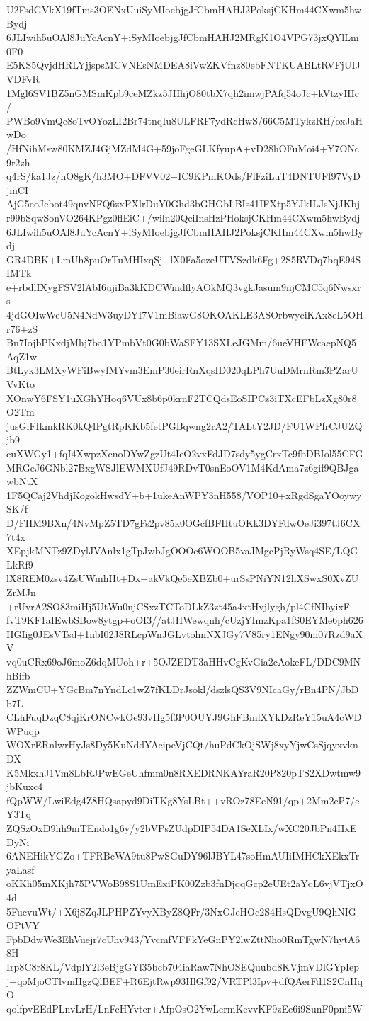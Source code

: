 U2FsdGVkX19fTms3OENxUuiSyMIoebjgJfCbmHAHJ2PoksjCKHm44CXwm5hwBydj
6JLIwih5uOAl8JuYcAcnY+iSyMIoebjgJfCbmHAHJ2MRgK1O4VPG73jxQYlLm0F0
E5KS5QvjdHRLYjjspsMCVNEsNMDEA8iVwZKVfnz80ebFNTKUABLtRVFjUIJVDFvR
1Mgl6SV1BZ5nGMSmKpb9ceMZkz5JHhjO80tbX7qh2imwjPAfq54oJc+kVtzyIHc/
PWBo9VmQc8oTvOYozLI2Br74tnqIu8ULFRF7ydRcHwS/66C5MTykzRH/oxJaHwDo
/HfNihMsw80KMZJ4GjMZdM4G+59joFgeGLKfyupA+vD28hOFuMoi4+Y7ONc9r2zh
q4rS/ka1Jz/hO8gK/h3MO+DFVV02+IC9KPmKOds/FlFziLuT4DNTUFf97VyDjmCI
AjG5eoJebot49qnvNFQ6zxPXlrDuY0Ghd3bGHGbLBIs41IFXtp5YJkILJsNjJKbj
r99bSqwSonVO264KPgz0flEiC+/wiln20QeiInsHzPHoksjCKHm44CXwm5hwBydj
6JLIwih5uOAl8JuYcAcnY+iSyMIoebjgJfCbmHAHJ2PoksjCKHm44CXwm5hwBydj
GR4DBK+LmUh8puOrTuMHIxqSj+lX0Fa5ozeUTVSzdk6Fg+2S5RVDq7bqE94SIMTk
e+rbdlIXygFSV2lAbI6ujiBa3kKDCWmdflyAOkMQ3vgkJasum9njCMC5q6Nwsxrs
4jdGOIwWeU5N4NdW3uyDYI7V1mBiawG8OKOAKLE3ASOrbwyciKAx8eL5OHr76+zS
Bn7IojbPKxdjMhj7ba1YPmbVt0G0bWaSFY13SXLeJGMm/6ueVHFWcaepNQ5AqZ1w
BtLyk3LMXyWFiBwyfMYvm3EmP30eirRnXqsID020qLPh7UuDMrnRm3PZarUVvKto
XOnwY6FSY1uXGhYHoq6VUx8b6p0krnF2TCQdsEoSIPCz3iTXcEFbLzXg80r8O2Tm
jusGlFIkmkRK0kQ4PgtRpKKb5fetPGBqwng2rA2/TALtY2JD/FU1WPfrCJUZQjb9
cuXWGy1+fqI4XwpzXcnoDYwZgzUt4IeO2vxFdJD7sdy5ygCrxTc9fbDBIol55CFG
MRGeJ6GNbl27BxgWSJlEWMXUfJ49RDvT0snEoOV1M4KdAma7z6gif9QBJgawbNtX
1F5QCaj2VhdjKogokHwsdY+b+1ukeAnWPY3nH558/VOP10+xRgdSgaYOoywySK/f
D/FHM9BXn/4NvMpZ5TD7gFs2pv85k0OGcfBFHtuOKk3DYFdwOeJi397tJ6CX7t4x
XEpjkMNTz9ZDylJVAnlx1gTpJwbJgOOOc6WOOB5vaJMgcPjRyWsq4SE/LQGLkRf9
lX8REM0zsv4ZsUWmhHt+Dx+akVkQe5eXBZb0+urSsPNiYN12hXSwxS0XvZUZrMJn
+rUvrA2SO83miHj5UtWu0njCSxzTCToDLkZ3zt45a4xtHvjlygh/pl4CfNIbyixF
fvT9KF1aIEwbSBow8ytgp+oOI3//atJHWewqnh/cUzjYImzKpa1fS0EYMe6ph626
HGIig0JEsVTsd+1nbI02J8RLcpWnJGLvtohnNXJGy7V85ry1ENgy90m07Rzd9aXV
vq0uCRx69oJ6moZ6dqMUoh+r+5OJZEDT3aHHvCgKvGia2cAokeFL/DDC9MNhBifb
ZZWmCU+YGcBm7nYndLc1wZ7fKLDrJsokl/dszlsQS3V9NIcaGy/rBn4PN/JbDb7L
CLhFuqDzqC8qjKrONCwkOe93vHg5f3P0OUYJ9GhFBmlXYkDzReY15uA4cWDWPuqp
WOXrERnlwrHyJs8Dy5KuNddYAeipeVjCQt/huPdCkOjSWj8xyYjwCsSjqyxvknDX
K5MkxhJ1Vm8LbRJPwEGeUhfmm0n8RXEDRNKAYraR20P820pTS2XDwtmw9jbKuxc4
fQpWW/LwiEdg4Z8HQsapyd9DiTKg8YsLBt++vROz78EeN91/qp+2Mm2eP7/eY3Tq
ZQSzOxD9hh9mTEndo1g6y/y2bVPsZUdpDIP54DA1SeXLIx/wXC20JbPn4HxEDyNi
6ANEHikYGZo+TFRBcWA9tu8PwSGuDY96lJBYL47soHmAUIiIMHCkXEkxTryaLasf
oKKh05mXKjh75PVWoB98S1UmExiPK00Zzb3fnDjqqGcp2eUEt2aYqL6vjVTjxO4d
5FucvuWt/+X6jSZqJLPHPZYvyXByZ8QFr/3NxGJeHOc2S4HsQDvgU9QhNIGOPtVY
FpbDdwWe3EhVuejr7cUhv943/YvcmfVFFkYeGnPY2lwZttNho0RmTgwN7hytA68H
Irp8C8r8KL/VdplY2l3eBjgGYl35bcb704iaRaw7NhOSEQuubd8KVjmVDlGYpIep
j+qoMjoCTlvmHgzQlBEF+R6EjtRwp93HlGf92/VRTPl3Ipv+dfQAerFd1S2CnHqO
qolfpvEEdPLnvLrH/LnFeHYvtcr+AfpOsO2YwLermKevvKF9zEe6i9SunF0pni5W
